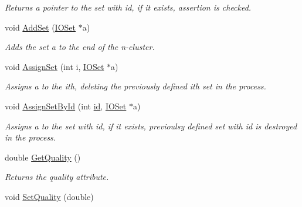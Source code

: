 \begin{DoxyCompactItemize}
\begin{DoxyCompactList}\small\item\em Returns a pointer to the set with id, if it exists, assertion is checked. \item\end{DoxyCompactList}\item 
\hypertarget{class_n_cluster_af4eeecc0717c16ffaa931a0100739f31}{
void \hyperlink{class_n_cluster_af4eeecc0717c16ffaa931a0100739f31}{AddSet} (\hyperlink{class_i_o_set}{IOSet} $\ast$a)}
\label{class_n_cluster_af4eeecc0717c16ffaa931a0100739f31}

\begin{DoxyCompactList}\small\item\em Adds the set a to the end of the n-\/cluster. \item\end{DoxyCompactList}\item 
\hypertarget{class_n_cluster_a7d5ab8fb3293b472b57cb9e964f5b90e}{
void \hyperlink{class_n_cluster_a7d5ab8fb3293b472b57cb9e964f5b90e}{AssignSet} (int i, \hyperlink{class_i_o_set}{IOSet} $\ast$a)}
\label{class_n_cluster_a7d5ab8fb3293b472b57cb9e964f5b90e}

\begin{DoxyCompactList}\small\item\em Assigns a to the ith, deleting the previously defined ith set in the process. \item\end{DoxyCompactList}\item 
\hypertarget{class_n_cluster_a0b117e61aee299f09f385f0b890bf0e1}{
void \hyperlink{class_n_cluster_a0b117e61aee299f09f385f0b890bf0e1}{AssignSetById} (int \hyperlink{class_n_cluster_a9360cadd4e338b91de61f86997acc890}{id}, \hyperlink{class_i_o_set}{IOSet} $\ast$a)}
\label{class_n_cluster_a0b117e61aee299f09f385f0b890bf0e1}

\begin{DoxyCompactList}\small\item\em Assigns a to the set with id, if it exists, previoulsy defined set with id is destroyed in the process. \item\end{DoxyCompactList}\item 
\hypertarget{class_n_cluster_aad3afb3c6ca495bd69fe0593455ca785}{
double \hyperlink{class_n_cluster_aad3afb3c6ca495bd69fe0593455ca785}{GetQuality} ()}
\label{class_n_cluster_aad3afb3c6ca495bd69fe0593455ca785}

\begin{DoxyCompactList}\small\item\em Returns the quality attribute. \item\end{DoxyCompactList}\item 
\hypertarget{class_n_cluster_abf7185a77e66f15d4ff3b400d51d1064}{
void \hyperlink{class_n_cluster_abf7185a77e66f15d4ff3b400d51d1064}{SetQuality} (double)}
\label{class_n_cluster_abf7185a77e66f15d4ff3b400d51d1064}


\end{DoxyCompactItemize}
